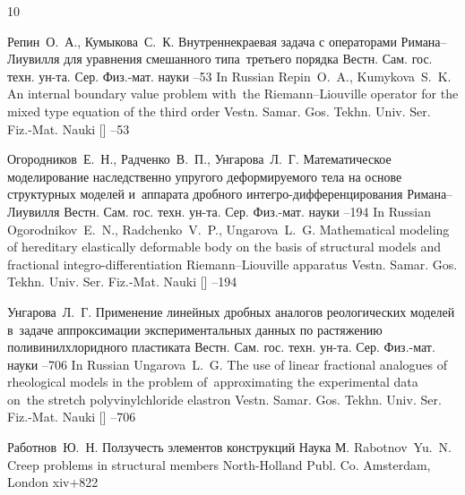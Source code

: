 \begin{thebibliography}{10}

\by Репин~О.~А., Кумыкова~С.~К.
\paper Внутреннекраевая задача с операторами Римана--Лиувилля для уравнения смешанного типа~третьего порядка
\jour Вестн. Сам. гос. техн. ун-та. Сер. Физ.-мат. науки
--53
\misctransl
\lang In Russian
\by Repin~O.~A., Kumykova~S.~K.
\paper An internal boundary value problem with~the Riemann--Liouville operator for the mixed type equation of the third order
\jour Vestn. Samar. Gos. Tekhn. Univ. Ser. Fiz.-Mat. Nauki \rm [\ParallelJournalName]
--53

\by Огородников~Е.~Н., Радченко~В.~П., Унгарова~Л.~Г.
\paper Математическое моделирование наследственно упругого деформируемого тела 
на основе структурных моделей и~аппарата дробного 
интегро-дифференцирования Римана--Лиувилля
\jour Вестн. Сам. гос. техн. ун-та. Сер. Физ.-мат. науки
--194
\misctransl
\lang In Russian
\by Ogorodnikov~E.~N., Radchenko~V.~P., Ungarova~L.~G.
\paper Mathematical modeling of hereditary elastically deformable body on the basis 
of structural models and fractional integro-differentiation Riemann--Liouville apparatus
\jour Vestn. Samar. Gos. Tekhn. Univ. Ser. Fiz.-Mat. Nauki \rm [\ParallelJournalName]
--194


\by Унгарова~Л.~Г.
\paper Применение линейных дробных аналогов реологических моделей в~задаче аппроксимации экспериментальных данных 
по растяжению поливинилхлоридного пластиката
\jour Вестн. Сам. гос. техн. ун-та. Сер. Физ.-мат. науки 
--706
\misctransl
\lang In Russian
\by Ungarova~L.~G.
\paper The use of linear fractional analogues of rheological models in the problem of~approximating the experimental data 
on~the stretch polyvinylchloride elastron
\jour Vestn. Samar. Gos. Tekhn. Univ. Ser. Fiz.-Mat. Nauki \rm [\ParallelJournalName]
--706


\by Работнов~Ю.~Н.
\book Ползучесть элементов конструкций
\publ Наука
\publaddr М.
\transl
\by Rabotnov~Yu.~N.
\book Creep problems in structural members
\publ North-Holland Publ. Co.
\publaddr Amsterdam, London
\totalpages xiv+822


\end{thebibliography}
